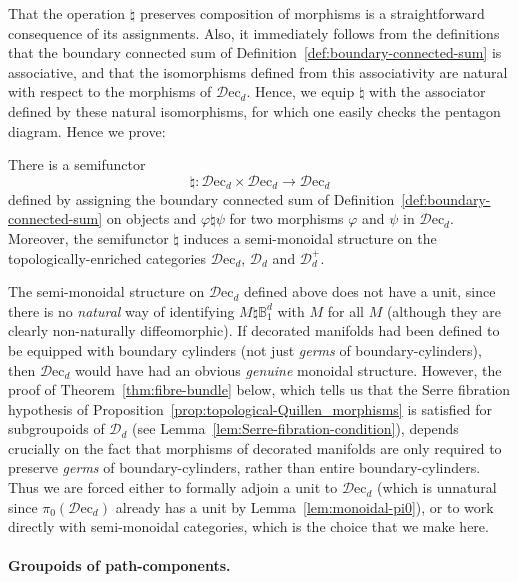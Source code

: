 \documentclass[AHL,Unicode,published]{cedram}
\newcommand{\rec}{\mathrm{ec}}
\newcommand{\cD}{\mathcal{D}}
\newcommand{\bB}{\mathbb{B}}
\newcommand{\too}{\ensuremath{\longrightarrow}}
\begin{document}
That the operation $\natural$ preserves composition of morphisms is a straightforward consequence of its assignments. Also, it immediately follows from the definitions that the boundary connected sum of Definition~\ref{def:boundary-connected-sum} is associative, and that the isomorphisms defined from this associativity are natural with respect to the morphisms of $\cD\rec_d$. Hence, we equip $\natural$ with the associator defined by these natural isomorphisms, for which one easily checks the pentagon diagram. Hence we prove:

\begin{prop}\label{prop:Dd-semi-monoidal}
There is a semifunctor
\[
\natural \colon \cD\rec_d \times \cD\rec_d \too \cD\rec_d
\]
defined by assigning the boundary connected sum of Definition~\ref{def:boundary-connected-sum} on objects and $\varphi\natural \psi$ for two morphisms $\varphi$ and $\psi$ in $\cD\rec_d$. Moreover, the semifunctor $\natural$ induces a semi-monoidal structure on the topologically-enriched categories $\cD\rec_d$, $\cD_{d}$ and $\cD_{d}^{+}$.
\end{prop}

\begin{rema}\label{r:semi-monoidal}
The semi-monoidal structure on $\cD\rec_d$ defined above does not have a unit, since there is no \emph{natural} way of identifying $M \natural \bB^d_{1}$ with $M$ for all $M$ (although they are clearly non-naturally diffeomorphic). If decorated manifolds had been defined to be equipped with boundary cylinders (not just \emph{germs} of boundary-cylinders), then $\cD\rec_d$ would have had an obvious
\emph{genuine} monoidal structure. However, the proof of Theorem~\ref{thm:fibre-bundle} below, which tells us that the Serre fibration hypothesis of Proposition~\ref{prop:topological-Quillen_morphisms} is satisfied for subgroupoids of $\cD_{d}$ (see Lemma~\ref{lem:Serre-fibration-condition}), depends crucially on the fact that morphisms of decorated manifolds are only required to preserve \emph{germs} of boundary-cylinders, rather than entire boundary-cylinders. Thus we are forced either to formally adjoin a unit to $\cD\rec_d$ (which is unnatural since $\pi_{0}(\cD\rec_d)$ already has a unit by Lemma~\ref{lem:monoidal-pi0}), or to work directly with semi-monoidal categories, which is the choice that we make here.
\end{rema}


\paragraph*{Groupoids of path-components.}
\end{document}
